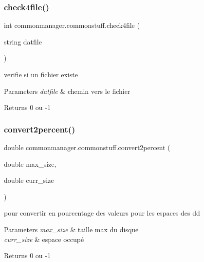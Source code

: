 \subsubsection{\texorpdfstring{check4file()}{check4file()}}
{\footnotesize\ttfamily int commonmanager.\+commonstuff.\+check4file (\begin{DoxyParamCaption}\item[{string}]{datfile }\end{DoxyParamCaption})}



verifie si un fichier existe 


\begin{DoxyParams}{Parameters}
{\em datfile} & chemin vers le fichier\\
\hline
\end{DoxyParams}
\begin{DoxyReturn}{Returns}
0 ou -\/1
\end{DoxyReturn}
\mbox{\label{classcommonmanager_1_1commonstuff_ac3d462747c67f057c8b58c5fd278fae0}} 
\subsubsection{\texorpdfstring{convert2percent()}{convert2percent()}}
{\footnotesize\ttfamily double commonmanager.\+commonstuff.\+convert2percent (\begin{DoxyParamCaption}\item[{double}]{max\+\_\+size,  }\item[{double}]{curr\+\_\+size }\end{DoxyParamCaption})}



pour convertir en pourcentage des valeurs pour les espaces des dd 


\begin{DoxyParams}{Parameters}
{\em max\+\_\+size} & taille max du disque\\
\hline
{\em curr\+\_\+size} & espace occupé\\
\hline
\end{DoxyParams}
\begin{DoxyReturn}{Returns}
0 ou -\/1
\end{DoxyReturn}
\mbox{\label{classcommonmanager_1_1commonstuff_a0145bf799146572b168bd53ec1b92643}} 
